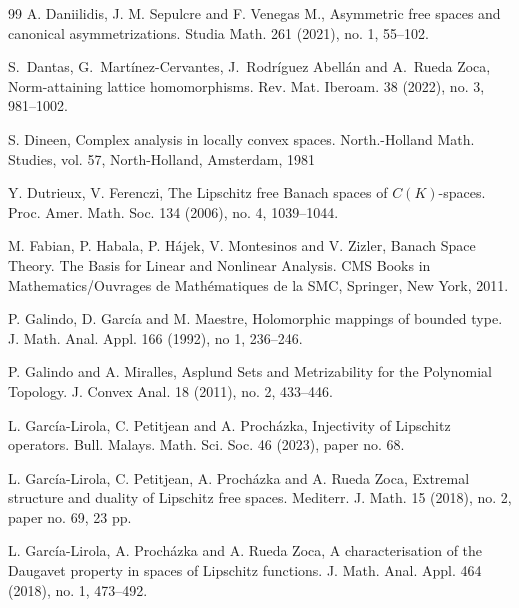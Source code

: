 \documentclass[12pt,leqno]{amsart}
\numberwithin{equation}{section} %
\theoremstyle{definition}
\numberwithin{equation}{section}
\begin{document}
\begin{thebibliography}{99}
A. Daniilidis, J. M. Sepulcre and F. Venegas M., Asymmetric free spaces and canonical asymmetrizations. Studia Math. 261 (2021), no. 1, 55--102.

S.~Dantas, G.~Mart\'inez-Cervantes, J.~Rodr\'iguez Abell\'an and A.~Rueda Zoca, Norm-attaining lattice homomorphisms. Rev. Mat. Iberoam. 38 (2022), no. 3, 981--1002.



S. Dineen, Complex analysis in locally convex spaces. North.-Holland Math. Studies, vol. 57,
North-Holland, Amsterdam, 1981


 Y. Dutrieux, V. Ferenczi, The Lipschitz free Banach spaces of $C(K)$-spaces. Proc. Amer. Math. Soc. 134 (2006), no. 4, 1039--1044.
   
M. Fabian, P. Habala, P. H\'{a}jek, V. Montesinos and V. Zizler, Banach Space Theory. The Basis for
Linear and Nonlinear Analysis. CMS Books in Mathematics/Ouvrages de Math\'ematiques de
la SMC, Springer, New York, 2011.

P. Galindo, D. Garc\'{i}a and M. Maestre,
Holomorphic mappings of bounded type.
J. Math. Anal. Appl.
166 (1992), no 1, 236--246.

P. Galindo and A. Miralles, Asplund Sets and Metrizability for the Polynomial Topology. J. Convex Anal. 18 (2011), no. 2, 433--446.

 L. Garc\'ia-Lirola, C. Petitjean and A. Proch\'azka, Injectivity of Lipschitz operators. Bull. Malays. Math. Sci. Soc. 46 (2023), paper no. 68. 

 L. Garc\'ia-Lirola, C. Petitjean, A. Proch\'azka and A. Rueda Zoca, Extremal structure and duality of Lipschitz free spaces. Mediterr. J. Math. 15 (2018), no. 2, paper no. 69, 23 pp.

 L. Garc\'ia-Lirola, A. Proch\'azka and A. Rueda Zoca, A characterisation of the Daugavet property in spaces of Lipschitz functions. J. Math. Anal. Appl. 464 (2018), no. 1, 473--492.



\end{thebibliography}
\end{document}
